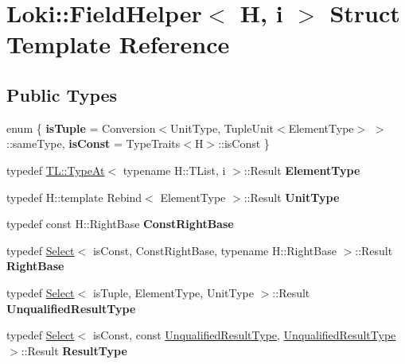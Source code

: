 \hypertarget{structLoki_1_1FieldHelper}{}\section{Loki\+:\+:Field\+Helper$<$ H, i $>$ Struct Template Reference}
\label{structLoki_1_1FieldHelper}
\subsection*{Public Types}
\begin{DoxyCompactItemize}
\item 
\hypertarget{structLoki_1_1FieldHelper_a465ed24d3d69a48357534b3f28afc671}{}enum \{ {\bfseries is\+Tuple} = Conversion$<$Unit\+Type, Tuple\+Unit$<$Element\+Type$>$ $>$\+:\+:same\+Type, 
{\bfseries is\+Const} = Type\+Traits$<$H$>$\+:\+:is\+Const
 \}\label{structLoki_1_1FieldHelper_a465ed24d3d69a48357534b3f28afc671}

\item 
\hypertarget{structLoki_1_1FieldHelper_ad7fbb15450b7545ecd408d9154bb5239}{}typedef \hyperlink{structLoki_1_1TL_1_1TypeAt}{T\+L\+::\+Type\+At}$<$ typename H\+::\+T\+List, i $>$\+::Result {\bfseries Element\+Type}\label{structLoki_1_1FieldHelper_ad7fbb15450b7545ecd408d9154bb5239}

\item 
\hypertarget{structLoki_1_1FieldHelper_abe11dd8531413300c337e282c9542ff0}{}typedef H\+::template Rebind$<$ Element\+Type $>$\+::Result {\bfseries Unit\+Type}\label{structLoki_1_1FieldHelper_abe11dd8531413300c337e282c9542ff0}

\item 
\hypertarget{structLoki_1_1FieldHelper_ab6e53e12f907530ddc45157a245fb33f}{}typedef const H\+::\+Right\+Base {\bfseries Const\+Right\+Base}\label{structLoki_1_1FieldHelper_ab6e53e12f907530ddc45157a245fb33f}

\item 
\hypertarget{structLoki_1_1FieldHelper_a380b005994b88a5020e657e5c160a527}{}typedef \hyperlink{structLoki_1_1Select}{Select}$<$ is\+Const, Const\+Right\+Base, typename H\+::\+Right\+Base $>$\+::Result {\bfseries Right\+Base}\label{structLoki_1_1FieldHelper_a380b005994b88a5020e657e5c160a527}

\item 
\hypertarget{structLoki_1_1FieldHelper_ae004bb56043edf3a01c7c534ef322600}{}typedef \hyperlink{structLoki_1_1Select}{Select}$<$ is\+Tuple, Element\+Type, Unit\+Type $>$\+::Result {\bfseries Unqualified\+Result\+Type}\label{structLoki_1_1FieldHelper_ae004bb56043edf3a01c7c534ef322600}

\item 
\hypertarget{structLoki_1_1FieldHelper_a264a494f18fdb612e690e5c3c7c36258}{}typedef \hyperlink{structLoki_1_1Select}{Select}$<$ is\+Const, const \hyperlink{structP1}{Unqualified\+Result\+Type}, \hyperlink{structP1}{Unqualified\+Result\+Type} $>$\+::Result {\bfseries Result\+Type}\label{structLoki_1_1FieldHelper_a264a494f18fdb612e690e5c3c7c36258}

\end{DoxyCompactItemize}

